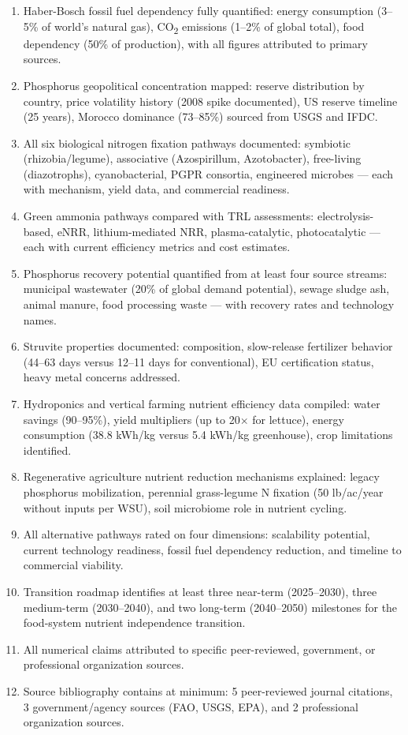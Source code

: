 \documentclass[11pt,letterpaper]{article}
\begin{document}
\begin{enumerate}[leftmargin=1.5em]
  \item Haber-Bosch fossil fuel dependency fully quantified: energy consumption (3--5\% of world's natural gas), CO\textsubscript{2} emissions (1--2\% of global total), food dependency (50\% of production), with all figures attributed to primary sources.
  \item Phosphorus geopolitical concentration mapped: reserve distribution by country, price volatility history (2008 spike documented), US reserve timeline (25 years), Morocco dominance (73--85\%) sourced from USGS and IFDC.
  \item All six biological nitrogen fixation pathways documented: symbiotic (rhizobia/legume), associative (Azospirillum, Azotobacter), free-living (diazotrophs), cyanobacterial, PGPR consortia, engineered microbes --- each with mechanism, yield data, and commercial readiness.
  \item Green ammonia pathways compared with TRL assessments: electrolysis-based, eNRR, lithium-mediated NRR, plasma-catalytic, photocatalytic --- each with current efficiency metrics and cost estimates.
  \item Phosphorus recovery potential quantified from at least four source streams: municipal wastewater (20\% of global demand potential), sewage sludge ash, animal manure, food processing waste --- with recovery rates and technology names.
  \item Struvite properties documented: composition, slow-release fertilizer behavior (44--63 days versus 12--11 days for conventional), EU certification status, heavy metal concerns addressed.
  \item Hydroponics and vertical farming nutrient efficiency data compiled: water savings (90--95\%), yield multipliers (up to 20$\times$ for lettuce), energy consumption (38.8 kWh/kg versus 5.4 kWh/kg greenhouse), crop limitations identified.
  \item Regenerative agriculture nutrient reduction mechanisms explained: legacy phosphorus mobilization, perennial grass-legume N fixation (50 lb/ac/year without inputs per WSU), soil microbiome role in nutrient cycling.
  \item All alternative pathways rated on four dimensions: scalability potential, current technology readiness, fossil fuel dependency reduction, and timeline to commercial viability.
  \item Transition roadmap identifies at least three near-term (2025--2030), three medium-term (2030--2040), and two long-term (2040--2050) milestones for the food-system nutrient independence transition.
  \item All numerical claims attributed to specific peer-reviewed, government, or professional organization sources.
  \item Source bibliography contains at minimum: 5 peer-reviewed journal citations, 3 government/agency sources (FAO, USGS, EPA), and 2 professional organization sources.
\end{enumerate}
\end{document}
